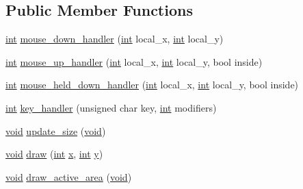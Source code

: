 \subsection*{Public Member Functions}
\begin{DoxyCompactItemize}
\item 
\hyperlink{wglext_8h_a500a82aecba06f4550f6849b8099ca21}{int} \hyperlink{class_g_l_u_i___checkbox_a7cf605868f357f790890fb1eb01c4b5b}{mouse\+\_\+down\+\_\+handler} (\hyperlink{wglext_8h_a500a82aecba06f4550f6849b8099ca21}{int} local\+\_\+x, \hyperlink{wglext_8h_a500a82aecba06f4550f6849b8099ca21}{int} local\+\_\+y)
\item 
\hyperlink{wglext_8h_a500a82aecba06f4550f6849b8099ca21}{int} \hyperlink{class_g_l_u_i___checkbox_a600720d43a3f7568c41cc23a34f7f601}{mouse\+\_\+up\+\_\+handler} (\hyperlink{wglext_8h_a500a82aecba06f4550f6849b8099ca21}{int} local\+\_\+x, \hyperlink{wglext_8h_a500a82aecba06f4550f6849b8099ca21}{int} local\+\_\+y, bool inside)
\item 
\hyperlink{wglext_8h_a500a82aecba06f4550f6849b8099ca21}{int} \hyperlink{class_g_l_u_i___checkbox_ad18f2ba9f3dc594db3f60c32bc9fe4d2}{mouse\+\_\+held\+\_\+down\+\_\+handler} (\hyperlink{wglext_8h_a500a82aecba06f4550f6849b8099ca21}{int} local\+\_\+x, \hyperlink{wglext_8h_a500a82aecba06f4550f6849b8099ca21}{int} local\+\_\+y, bool inside)
\item 
\hyperlink{wglext_8h_a500a82aecba06f4550f6849b8099ca21}{int} \hyperlink{class_g_l_u_i___checkbox_a246a4aea27d74689643eb4c1d5dc25ef}{key\+\_\+handler} (unsigned char key, \hyperlink{wglext_8h_a500a82aecba06f4550f6849b8099ca21}{int} modifiers)
\item 
\hyperlink{wglext_8h_a9e6b7f1933461ef318bb000d6bd13b83}{void} \hyperlink{class_g_l_u_i___checkbox_adce7c97553cc1b8b8200bf173efbffb1}{update\+\_\+size} (\hyperlink{wglext_8h_a9e6b7f1933461ef318bb000d6bd13b83}{void})
\item 
\hyperlink{wglext_8h_a9e6b7f1933461ef318bb000d6bd13b83}{void} \hyperlink{class_g_l_u_i___checkbox_ad03530c711561d3d32348c8ee3f39b5a}{draw} (\hyperlink{wglext_8h_a500a82aecba06f4550f6849b8099ca21}{int} \hyperlink{glext_8h_ad77deca22f617d3f0e0eb786445689fc}{x}, \hyperlink{wglext_8h_a500a82aecba06f4550f6849b8099ca21}{int} \hyperlink{glext_8h_a9298c7ad619074f5285b32c6b72bfdea}{y})
\item 
\hyperlink{wglext_8h_a9e6b7f1933461ef318bb000d6bd13b83}{void} \hyperlink{class_g_l_u_i___checkbox_ae6b129ff35269a2510e3c38f627d82a3}{draw\+\_\+active\+\_\+area} (\hyperlink{wglext_8h_a9e6b7f1933461ef318bb000d6bd13b83}{void})

\end{DoxyCompactItemize}
